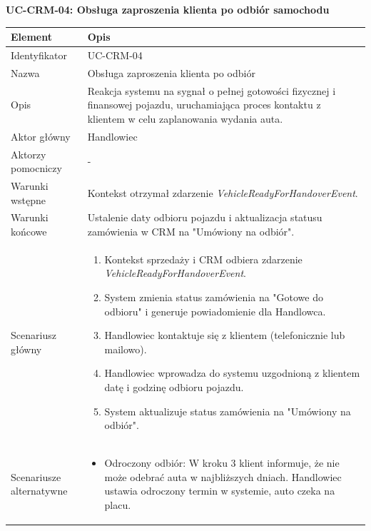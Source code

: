 \textbf{UC-CRM-04: Obsługa zaproszenia klienta po odbiór samochodu}

\begin{longtable}{|p{4cm}|p{11cm}|}
\hline
\textbf{Element} & \textbf{Opis} \\
\hline

Identyfikator & UC-CRM-04 \\
\hline

Nazwa & Obsługa zaproszenia klienta po odbiór \\
\hline

Opis & 
Reakcja systemu na sygnał o pełnej gotowości fizycznej i finansowej pojazdu, uruchamiająca proces kontaktu z klientem w celu zaplanowania wydania auta. \\
\hline

Aktor główny & Handlowiec \\
\hline

Aktorzy pomocniczy & - \\
\hline

Warunki wstępne & 
Kontekst otrzymał zdarzenie \textit{VehicleReadyForHandoverEvent}. \\
\hline

Warunki końcowe & 
Ustalenie daty odbioru pojazdu i aktualizacja statusu zamówienia w CRM na "Umówiony na odbiór". \\
\hline

Scenariusz główny & 
\begin{enumerate}
    \item Kontekst sprzedaży i CRM odbiera zdarzenie \textit{VehicleReadyForHandoverEvent}.
    \item System zmienia status zamówienia na "Gotowe do odbioru" i generuje powiadomienie dla Handlowca.
    \item Handlowiec kontaktuje się z klientem (telefonicznie lub mailowo).
    \item Handlowiec wprowadza do systemu uzgodnioną z klientem datę i godzinę odbioru pojazdu.
    \item System aktualizuje status zamówienia na "Umówiony na odbiór".
\end{enumerate} \\
\hline

Scenariusze alternatywne & 
\begin{itemize}
    \item [A1] Odroczony odbiór: W kroku 3 klient informuje, że nie może odebrać auta w najbliższych dniach. Handlowiec ustawia odroczony termin w systemie, auto czeka na placu.
\end{itemize} \\
\hline
\end{longtable}

